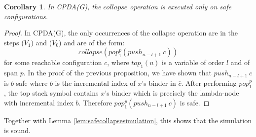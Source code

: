 \documentclass{article}
\newtheorem{corollary}[theorem]{Corollary}
\theoremstyle{remark}
\theoremstyle{definition}
\newcommand\orddec\overline
\begin{document}
\begin{corollary}
In CPDA(G), the $collapse$ operation is executed only on safe configurations.
\end{corollary}
\begin{proof}
In CPDA(G), the only occurrences of the collapse operation are in the steps ($V_1$) and ($V_0$) and are of the form:
$$ collapse(pop_1^p(push_{n-l+1}~c))$$
for some reachable configuration $c$, where $top_1(u)$ is a variable of order $l$ and of span $p$. In the proof of the previous proposition, we have shown that
$push_{n-l+1}~c$ is $b$-safe where $b$ is the incremental index of $x$'s binder in $\orddec{c}$. After performing $pop_1^p$, the top stack symbol contains $x$'s
binder which is precisely the lambda-node with incremental index $b$. Therefore $pop^p_1(push_{n-l+1}~c)$ is safe.
\end{proof}

Together with Lemma \ref{lem:safecollapsesimulation}, this shows that the simulation is sound.
\end{document}
